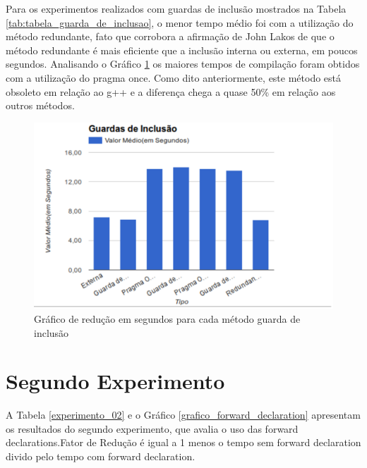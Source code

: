 Para os experimentos realizados com guardas de inclusão mostrados na 
Tabela \ref{tab:tabela_guarda_de_inclusao}, o menor tempo médio foi
 com a utilização do método redundante, fato  que corrobora a afirmação
 de John Lakos de que o método redundante é mais eficiente que a inclusão
 interna ou externa, em poucos segundos. Analisando o Gráfico 
\ref{grafico_guardas_de_inclusao} os maiores tempos de compilação foram 
 obtidos com a utilização do pragma once. Como dito anteriormente, este 
método está obsoleto em relação ao g++ e a diferença chega a quase 50\%
 em relação aos outros métodos.

\begin{figure}[h]
    \centering
        \includegraphics[keepaspectratio=true,scale=1]{figuras/guardas_de_inclusao.eps}
    \caption{Gráfico de redução em segundos para cada método guarda de inclusão}
    \label{grafico_guardas_de_inclusao}
\end{figure}


\section{Segundo Experimento}


A Tabela \ref{experimento_02} e o Gráfico \ref{grafico_forward_declaration} apresentam os resultados do
 segundo experimento, que avalia o uso das forward declarations.Fator de
 Redução é igual a 1 menos o tempo sem forward declaration divido pelo
 tempo com forward declaration.



